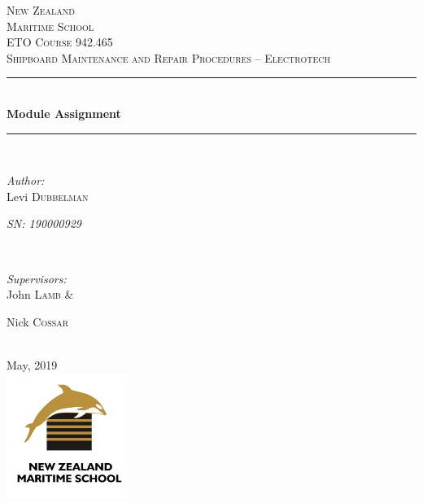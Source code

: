 \documentclass[11pt,a4paper]{article}
\begin{document}
\begin{titlepage}

\newcommand{\HRule}{\rule{\linewidth}{0.5mm}} %

\center %


\textsc{\LARGE New Zealand}\\[0.5cm]

\textsc{\LARGE  Maritime School}\\[1.5cm]
\textsc{\Large ETO Course 942.465}\\[0.2cm] %
\textsc{\large Shipboard Maintenance and Repair Procedures – Electrotech}\\[0.5cm] %


\HRule \\[0.5cm]
{ \huge \bfseries Module Assignment}\\[0.2cm] %
\HRule \\[0.5cm]
\begin{minipage}{0.4\textwidth}
\begin{flushleft} \large
\emph{Author:}\\
Levi \textsc{Dubbelman}

\textit{SN: 190000929}\par
\end{flushleft}
\end{minipage}
~
\begin{minipage}{0.4\textwidth}
\begin{flushright} \large
\emph{Supervisors:} \\
John \textsc{Lamb} \&

Nick \textsc{Cossar}
\end{flushright}
\end{minipage}\\[2cm]
{\large May, 2019}\\[2cm]
\includegraphics[width=4cm]{logo.png}
\vfill

\end{titlepage}
\end{document}
